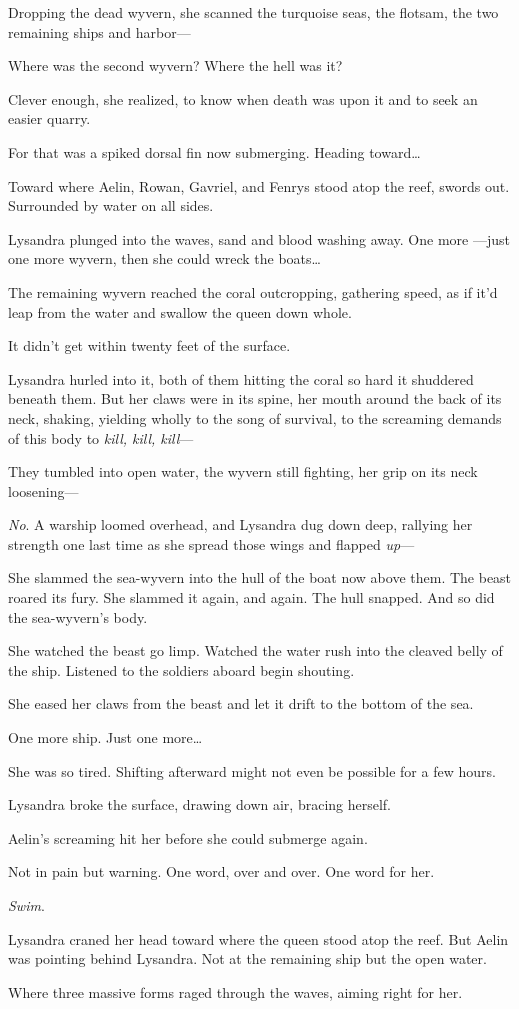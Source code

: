 Dropping the dead wyvern, she scanned the turquoise seas, the flotsam, the two remaining ships and harbor---

Where was the second wyvern? Where the hell was it?

Clever enough, she realized, to know when death was upon it and to seek an easier quarry.

For that was a spiked dorsal fin now submerging. Heading toward\ldots{}

Toward where Aelin, Rowan, Gavriel, and Fenrys stood atop the reef, swords out. Surrounded by water on all sides.

Lysandra plunged into the waves, sand and blood washing away. One more ---just one more wyvern, then she could wreck the boats\ldots{}

The remaining wyvern reached the coral outcropping, gathering speed, as if it'd leap from the water and swallow the queen down whole.

It didn't get within twenty feet of the surface.

Lysandra hurled into it, both of them hitting the coral so hard it shuddered beneath them. But her claws were in its spine, her mouth around the back of its neck, shaking, yielding wholly to the song of survival, to the screaming demands of this body to \emph{kill, kill, kill}---

They tumbled into open water, the wyvern still fighting, her grip on its neck loosening---

\emph{No}. A warship loomed overhead, and Lysandra dug down deep, rallying her strength one last time as she spread those wings and flapped \emph{up}---

She slammed the sea-wyvern into the hull of the boat now above them. The beast roared its fury. She slammed it again, and again. The hull snapped. And so did the sea-wyvern's body.

She watched the beast go limp. Watched the water rush into the cleaved belly of the ship. Listened to the soldiers aboard begin shouting.

She eased her claws from the beast and let it drift to the bottom of the sea.

One more ship. Just one more\ldots{}

She was so tired. Shifting afterward might not even be possible for a few hours.

Lysandra broke the surface, drawing down air, bracing herself.

Aelin's screaming hit her before she could submerge again.

Not in pain  but warning. One word, over and over. One word for her.

\emph{Swim}.

Lysandra craned her head toward where the queen stood atop the reef. But Aelin was pointing behind Lysandra. Not at the remaining ship 
but the open water.

Where three massive forms raged through the waves, aiming right for her.
